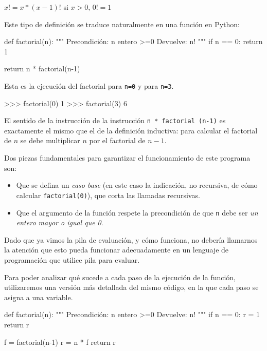 $x! = x * (x-1)!$ si $x>0$, $0! = 1$

Este tipo de definición se traduce naturalmente en una función en Python:

\begin{codigo-python-sn}
def factorial(n):
    """ Precondición: n entero >=0
        Devuelve: n! """
    if n == 0:
        return 1

    return n * factorial(n-1)
\end{codigo-python-sn}

Esta es la ejecución del factorial para \lstinline!n=0! y para
\lstinline!n=3!.

\begin{codigo-python-sn}
>>> factorial(0)
1
>>> factorial(3)
6
\end{codigo-python-sn}

El sentido de la instrucción de la instrucción 
\lstinline|n * factorial (n-1)| es exactamente el mismo que el de la
definición inductiva: para calcular el factorial de $n$ se debe multiplicar
$n$ por el factorial de $n-1$.

Dos piezas fundamentales para garantizar el funcionamiento de este programa
son:

\begin{itemize}
\item Que se defina un {\it caso base} (en este caso la indicación, no recursiva,
de cómo calcular \lstinline|factorial(0)|), que corta las llamadas recursivas.

\item Que el argumento de la función respete la precondición
de que \lstinline!n! debe ser {\it un entero mayor o igual que 0}.
\end{itemize}

Dado que ya vimos la pila de evaluación, y cómo funciona, no debería
llamarnos la atención que esto pueda funcionar adecuadamente en un lenguaje
de programación que utilice pila para evaluar.

Para poder analizar qué sucede a cada paso de la ejecución de la función,
utilizaremos una versión más detallada del mismo código, en la que cada
paso se asigna a una variable.

\begin{codigo-python-sn}
def factorial(n):
    """ Precondición: n entero >=0
        Devuelve: n! """
    if n == 0:
        r = 1
        return r

    f = factorial(n-1)
    r = n * f
    return r
\end{codigo-python-sn}

